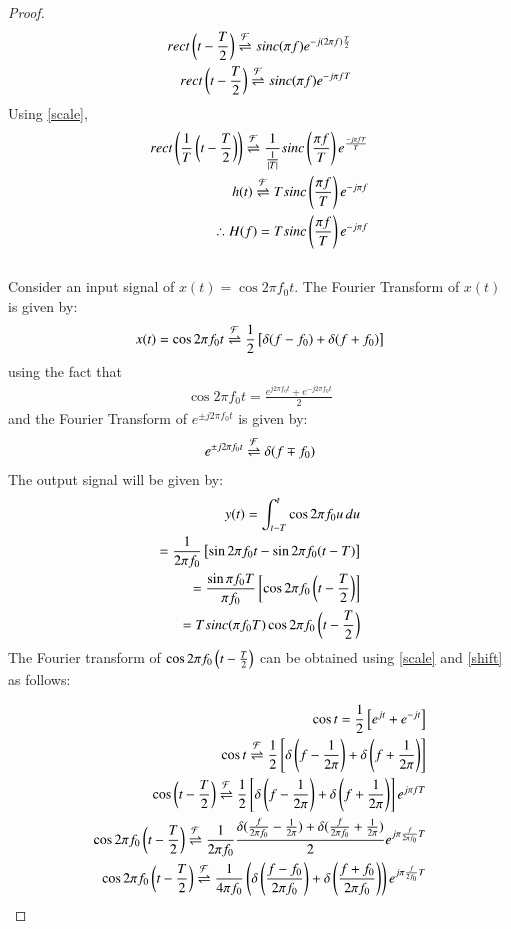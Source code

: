 \documentclass[journal,12pt,twocolumn]{IEEEtran}
\begin{document}
\begin{proof}
\begin{align}
    rect\left(t - \frac{T}{2}\right) \overset{\mathcal{F}}{ \rightleftharpoons} sinc(\pi f)e^{-j(2 \pi f)\frac{T}{2}}\\
    rect\left(t - \frac{T}{2}\right) \overset{\mathcal{F}}{ \rightleftharpoons} sinc(\pi f)e^{-j \pi f T}
\end{align}
Using \eqref{scale},
\begin{align}
    rect\left(\frac{1}{T}\left(t - \frac{T}{2}\right)\right) \overset{\mathcal{F}}{ \rightleftharpoons} \frac{1}{\frac{1}{\left\vert T\right\vert}}sinc\left(\frac{\pi f }{T}\right)e^{\frac{-j \pi f T}{T}}\\
    h(t) \overset{\mathcal{F}}{ \rightleftharpoons} Tsinc\left(\frac{\pi f }{T}\right)e^{-j\pi f}\\
    \therefore H(f)  = Tsinc\left(\frac{\pi f }{T}\right)e^{-j\pi f}
\end{align}\\


Consider an input signal of $x(t) = \cos{2\pi f_0t}$. The Fourier Transform of $x(t)$ is given by:
\begin{align}
    x(t) = \cos{2\pi f_0t} \overset{\mathcal{F}}{ \rightleftharpoons} \frac{1}{2}{}\left[\delta(f - f_0) + \delta(f + f_0)\right]
\end{align}
using the fact that 
\begin{align}
    \cos{2\pi f_0 t} = \frac{e^{j2\pi f_0 t} + e^{-j2\pi f_0 t}}{2}
\end{align} and the Fourier Transform of $e^{\pm j2\pi f_0 t}$ is given by:
\begin{align}
    e^{\pm j2\pi  f_0 t} \overset{\mathcal{F}}{ \rightleftharpoons} \delta(f \mp f_0)
    \label{FT}
\end{align}
The output signal will be given by:
\begin{align}
    y(t) = \int_{t-T}^t \cos{2\pi f_0u}\,du\\
     = \frac{1}{2\pi f_0}{}\left[\sin{2\pi f_0t}- \sin2\pi f_0({t-T})\right]\\
      = \frac{\sin\pi f_0 T}{\pi f_0} {}\left[\cos2\pi f_0 \left(t - \frac{T}{2}\right)\right]\\
      = Tsinc(\pi f_0 T)\cos2\pi f_0\left(t - \frac{T}{2}\right)
      \label{output}
\end{align}
The Fourier transform of $\cos2\pi f_0\left(t - \frac{T}{2}\right)$ can be obtained using \eqref{scale} and \eqref{shift} as follows:

\begin{align}
    \cos t = \frac{1}{2}{}\left[e^{jt} + e^{-jt}\right]\\
    \cos t \overset{\mathcal{F}}{ \rightleftharpoons} \frac{1}{2}{}\left[\delta\left(f - \frac{1}{2\pi}\right) + \delta\left(f + \frac{1}{2\pi}\right)\right]\\
    \cos\left(t - \frac{T}{2}\right) \overset{\mathcal{F}}{ \rightleftharpoons} \frac{1}{2}{}\left[\delta\left(f - \frac{1}{2\pi}\right) + \delta\left(f + \frac{1}{2\pi}\right)\right] e^{j\pi fT}\\
    \cos2\pi f_0\left(t - \frac{T}{2}\right) \overset{\mathcal{F}}{ \rightleftharpoons} \frac{1}{2\pi f_0}\frac{\delta(\frac{f}{2\pi f_0} - \frac{1}{2\pi}) + \delta(\frac{f}{2\pi f_0} + \frac{1}{2\pi})}{2} e^{j\pi \frac{f}{2\pi f_0}T}\\
    \cos 2\pi f_0\left(t - \frac{T}{2}\right) \overset{\mathcal{F}}{ \rightleftharpoons}\frac{1}{4\pi f_0}\left(\delta\left(\frac{f - f_0}{2\pi f_0}\right) + \delta\left(\frac{f + f_0}{2\pi f_0}\right)\right)e^{j\pi \frac{f}{2f_0}T}
\end{align}


\end{proof}
\end{document}
